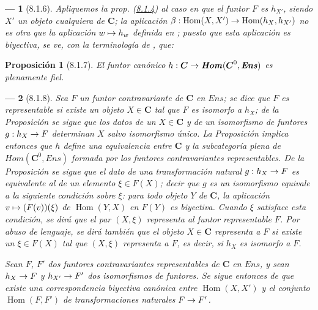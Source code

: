 \documentclass[10pt,oneside,openany]{book}
\makeatletter
\theoremstyle{egaenv}\newtheorem*{env}{---}
\theoremstyle{egastatement}
\newtheorem*{proposition}{Proposición}
\theoremstyle{egadescription}
\let\ega@shortmapsto\mapsto
\renewcommand{\to}{\mathchoice{\longrightarrow}{\rightarrow}{\rightarrow}{\rightarrow}}
\renewcommand{\mapsto}{\mathchoice{\longmapsto}{\ega@shortmapsto}{\ega@shortmapsto}{\ega@shortmapsto}}
\makeatother
\begin{document}
\begin{env}[8.1.6]
\label{0.8.1.6-fr}
Apliquemos la prop. (\hyperref[0.8.1.4-fr]{8.1.4}) al caso en que el funtor $F$ es $h_{X'}$, siendo $X'$ un
objeto cualquiera de $\boldsymbol{C}$; la aplicación $\beta:\operatorname{Hom}(X,X')\to\operatorname{Hom}(h_X,h_{X'})$ no es otra que la aplicación
$w\mapsto h_w$ definida en ; puesto que esta aplicación es \emph{biyectiva}, se ve,
con la terminología de , que:
\end{env}

\begin{proposition}[8.1.7]
\label{0.8.1.7}
\label{0.8.1.7-fr}
El funtor canónico $h:\boldsymbol{C}\to\boldsymbol{\mathit{Hom}}(\boldsymbol{C}^0,\boldsymbol{\mathit{Ens}})$ es plenamente fiel.
\end{proposition}

\begin{env}[8.1.8]
\label{0.8.1.8}
\label{0.8.1.8-fr}
Sea $F$ un funtor contravariante de $\boldsymbol{C}$ en $\boldsymbol{\mathit{Ens}}$; se dice que $F$ es \emph{representable} si
existe un objeto $X\in\boldsymbol{C}$ tal que $F$ es \emph{isomorfo} a $h_X$; de la
Proposición  se sigue que los datos de un $X\in\boldsymbol{C}$ y de un isomorfismo de funtores
$g:h_X\to F$ determinan $X$ salvo isomorfismo único. La Proposición  implica entonces
que $h$ define una \emph{equivalencia} entre $\boldsymbol{C}$ y la subcategoría plena de
$\boldsymbol{\mathit{Hom}}(\boldsymbol{C}^0,\boldsymbol{\mathit{Ens}})$ formada por los \emph{funtores contravariantes representables}. De la
Proposición  se sigue que el dato de una transformación natural $g:h_X\to F$ es
equivalente al de un elemento $\xi\in F(X)$; decir que $g$ es un \emph{isomorfismo} equivale
a la siguiente condición sobre $\xi$: \emph{para todo objeto $Y$ de $\boldsymbol{C}$, la aplicación
$v\mapsto(F(v))(\xi)$ de $\operatorname{Hom}(Y,X)$ en $F(Y)$ es biyectiva}. Cuando $\xi$ satisface esta condición, se dirá que el par $(X,\xi)$ \emph{representa} al funtor representable $F$. Por abuso de lenguaje, se dirá también que el objeto $X\in\boldsymbol{C}$ representa a $F$ si existe un $\xi\in F(X)$ tal que
$(X,\xi)$ representa a $F$, es decir, si $h_X$ es isomorfo a $F$.

Sean $F$, $F'$ dos funtores contravariantes representables de $\boldsymbol{C}$ en $\boldsymbol{\mathit{Ens}}$, y sean $h_X\to F$ y
$h_{X'}\to F'$ dos isomorfismos de funtores. Se sigue entonces de  que
existe una correspondencia biyectiva canónica entre $\operatorname{Hom}(X,X')$ y el conjunto $\operatorname{Hom}(F,F')$ de
transformaciones naturales $F\to F'$.
\end{env}
\end{document}
